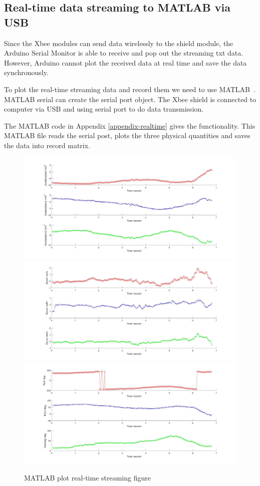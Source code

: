 \subsection{Real-time data streaming to MATLAB via USB}
Since the Xbee modules can send data wirelessly to the shield module, the Arduino Serial Monitor is able to receive and pop out the streaming txt data. However, Arduino cannot plot the received data at real time and save the data synchronously.

To plot the real-time streaming data and record them we need to use MATLAB~\cite{manalo2012usb}. MATLAB serial can create the serial port object. The Xbee shield is connected to computer via USB and using serial port to do data transmission.

The MATLAB code in Appendix \ref{appendix-realtime} gives the functionality. This MATLAB file reads the serial post, plots the three physical quantities and saves the data into record matrix.       

\begin{figure}[H]
\centering
\includegraphics[width=\textwidth]{fig/DOE/acceleration}
\includegraphics[width=\textwidth]{fig/DOE/gyro}
\includegraphics[width=\textwidth]{fig/DOE/orientation}
\caption{MATLAB plot real-time streaming figure}
\end{figure}

